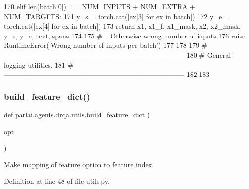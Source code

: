 \begin{DoxyCode}
170     \textcolor{keywordflow}{elif} len(batch[0]) == NUM\_INPUTS + NUM\_EXTRA + NUM\_TARGETS:
171         y\_s = torch.cat([ex[3] \textcolor{keywordflow}{for} ex \textcolor{keywordflow}{in} batch])
172         y\_e = torch.cat([ex[4] \textcolor{keywordflow}{for} ex \textcolor{keywordflow}{in} batch])
173         \textcolor{keywordflow}{return} x1, x1\_f, x1\_mask, x2, x2\_mask, y\_s, y\_e, text, spans
174 
175     \textcolor{comment}{# ...Otherwise wrong number of inputs}
176     \textcolor{keywordflow}{raise} RuntimeError(\textcolor{stringliteral}{'Wrong number of inputs per batch'})
177 
178 
179 \textcolor{comment}{# ------------------------------------------------------------------------------}
180 \textcolor{comment}{# General logging utilities.}
181 \textcolor{comment}{# ------------------------------------------------------------------------------}
182 
183 
\end{DoxyCode}
\mbox{\label{namespaceparlai_1_1agents_1_1drqa_1_1utils_a14201349d4a16b48aa7929cfdbf10ebd}} 
\subsubsection{\texorpdfstring{build\+\_\+feature\+\_\+dict()}{build\_feature\_dict()}}
{\footnotesize\ttfamily def parlai.\+agents.\+drqa.\+utils.\+build\+\_\+feature\+\_\+dict (\begin{DoxyParamCaption}\item[{}]{opt }\end{DoxyParamCaption})}

\begin{DoxyVerb}Make mapping of feature option to feature index.
\end{DoxyVerb}
 

Definition at line 48 of file utils.\+py.


